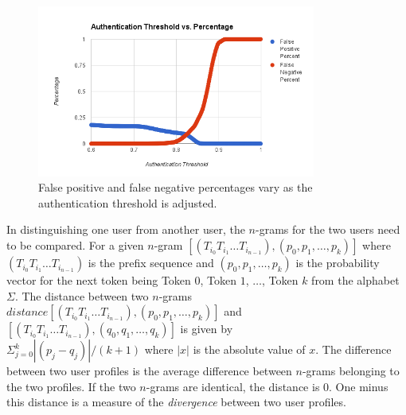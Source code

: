 \documentclass{acm_proc_article-sp}
\begin{document}
\begin{figure}
\centering
\includegraphics[width=3.6in]{threshold_vs_percentages.png}
\caption{False positive and false negative percentages vary as the authentication threshold is adjusted.}
\label{fig:threshold_vs_percentages}
\end{figure}

In distinguishing one user from another user, 
the $n$-grams for the two users need to be compared. 
For a given $n$-gram 
$[(T_{i_0} T_{i_1} \dots T_{i_{n-1}}), (p_0, p_1, \dots, p_k)]$ where 
$(T_{i_0} T_{i_1} \dots T_{i_{n-1}})$ is the prefix sequence and 
$(p_0, p_1, \dots, p_k)$ is the
probability vector for the next token being 
Token $0$, Token $1$, $\dots$, Token $k$ from the alphabet $\Sigma$.
The distance between two $n$-grams 
$distance[(T_{i_0} T_{i_1} \dots T_{i_{n-1}}), (p_0, p_1, \dots, p_k)]$ and \\
$[(T_{i_0} T_{i_1} \dots T_{i_{n-1}}), (q_0, q_1, \dots, q_k)]$ is given by \\
$\Sigma_{j=0}^k|(p_j - q_j)|/(k+1)$ where $|x|$ is the absolute value of $x$.
The difference between two user profiles is 
the average difference between $n$-grams belonging
to the two profiles.
If the two $n$-grams are identical, the distance is 0.
One minus this distance is a measure of the {\it divergence} between two user profiles.
\end{document}
